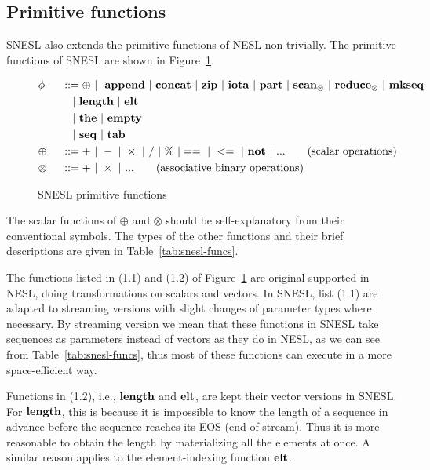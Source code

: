 \subsection{Primitive functions}

SNESL also extends the primitive functions of NESL non-trivially.
The primitive functions of SNESL are shown in Figure~\ref{fig-snesl-func}.

\begin{figure}[h]\large
\begin{alignat}{2} 
&\phi && ::= \oplus \ | \ \ \mathbf{append} \ | \ \mathbf{concat} \ | \ \mathbf{zip} \ | \ \mathbf{iota}  \ | \ \mathbf{part}  \ | \ \mathbf{scan}_{\otimes} \ | \ \mathbf{reduce}_{\otimes} \ | \ \mathbf{mkseq} \\
&   && \quad | \ \mathbf{length} \ | \ \mathbf{elt} \\
&   && \quad | \ \mathbf{the}  \ | \ \mathbf{empty} \\
&   && \quad | \ \mathbf{seq} \ | \ \mathbf{tab} \\
& \oplus  \ && :: = + \ | \ - \ | \ \times \ |  \  / \ | \ \% \ | ==  \ |\ <=  \ | \ \mathbf{not} \ | \ ... \tag{scalar operations} \\
& \otimes \ && :: = + \ | \ \times  \ | \ ...  \tag{associative binary operations}
\end{alignat}
\caption{SNESL primitive functions \label{fig-snesl-func}}
\end{figure}

The scalar functions of $\oplus$ and $\otimes$ should be self-explanatory from their conventional symbols. 
The types of the other functions and their brief descriptions are given in Table~\ref{tab:snesl-funcs}.

The functions listed in (1.1) and (1.2) of Figure~\ref{fig-snesl-func} are original supported in NESL, doing transformations on scalars and vectors.
In SNESL, list (1.1) are adapted to streaming versions with slight changes of parameter types where necessary.
By streaming version we mean that these functions in SNESL take sequences as parameters instead of vectors as they do in NESL, as we can see from Table~\ref{tab:snesl-funcs}, thus most of these functions can execute in a more space-efficient way.  

Functions in (1.2), i.e., $\mathbf{length}$ and $\mathbf{elt}$, are kept their vector versions in SNESL. 
For $\mathbf{length}$, this is because it is impossible to know the length of a sequence in advance before the sequence reaches its EOS (end of stream).
Thus it is more reasonable to obtain the length by materializing all the elements at once. 
A similar reason applies to the element-indexing function $\mathbf{elt}$.

